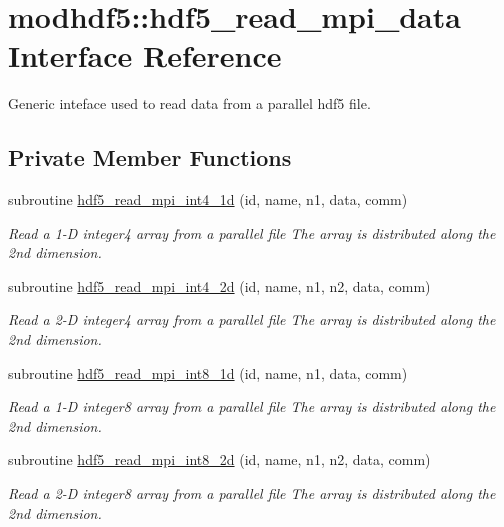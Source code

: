 \hypertarget{interfacemodhdf5_1_1hdf5__read__mpi__data}{\section{modhdf5\-:\-:hdf5\-\_\-read\-\_\-mpi\-\_\-data Interface Reference}
\label{interfacemodhdf5_1_1hdf5__read__mpi__data}
}


Generic inteface used to read data from a parallel hdf5 file.  


\subsection*{Private Member Functions}
\begin{DoxyCompactItemize}
\item 
subroutine \hyperlink{interfacemodhdf5_1_1hdf5__read__mpi__data_a1ad636a13c51c50de13eb1070aa325cc}{hdf5\-\_\-read\-\_\-mpi\-\_\-int4\-\_\-1d} (id, name, n1, data, comm)
\begin{DoxyCompactList}\small\item\em Read a 1-\/\-D integer4 array from a parallel file The array is distributed along the 2nd dimension. \end{DoxyCompactList}\item 
subroutine \hyperlink{interfacemodhdf5_1_1hdf5__read__mpi__data_adb25b404c7babd67561b609444f8b372}{hdf5\-\_\-read\-\_\-mpi\-\_\-int4\-\_\-2d} (id, name, n1, n2, data, comm)
\begin{DoxyCompactList}\small\item\em Read a 2-\/\-D integer4 array from a parallel file The array is distributed along the 2nd dimension. \end{DoxyCompactList}\item 
subroutine \hyperlink{interfacemodhdf5_1_1hdf5__read__mpi__data_a5a546e3a8ad2c01aa03f85ff9225d0ca}{hdf5\-\_\-read\-\_\-mpi\-\_\-int8\-\_\-1d} (id, name, n1, data, comm)
\begin{DoxyCompactList}\small\item\em Read a 1-\/\-D integer8 array from a parallel file The array is distributed along the 2nd dimension. \end{DoxyCompactList}\item 
subroutine \hyperlink{interfacemodhdf5_1_1hdf5__read__mpi__data_a7dcef34e2058f35d081d1c9b38269c6d}{hdf5\-\_\-read\-\_\-mpi\-\_\-int8\-\_\-2d} (id, name, n1, n2, data, comm)
\begin{DoxyCompactList}\small\item\em Read a 2-\/\-D integer8 array from a parallel file The array is distributed along the 2nd dimension. \end{DoxyCompactList}\item 

\end{DoxyCompactItemize}
